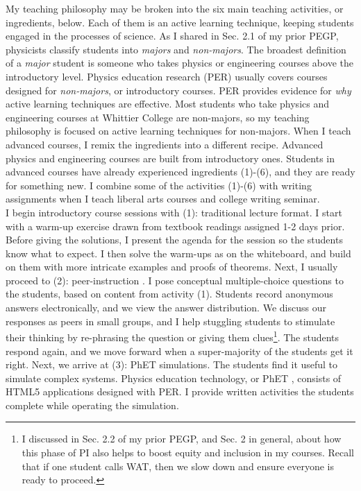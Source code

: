 \documentclass[../../../main.tex]{subfiles}
\begin{document}
My teaching philosophy may be broken into the six main teaching activities, or ingredients, below.  Each of them is an active learning technique, keeping students engaged in the processes of science.  As I shared in Sec. 2.1 of my prior PEGP, physicists classify students into \textit{majors} and \textit{non-majors}.  The broadest definition of a \textit{major} student is someone who takes physics or engineering courses above the introductory level.  Physics education research (PER) usually covers courses designed for \textit{non-majors}, or introductory courses.  PER provides evidence for \textit{why} active learning techniques are effective.  Most students who take physics and engineering courses at Whittier College are non-majors, so my teaching philosophy is focused on active learning techniques for non-majors.  When I teach advanced courses, I remix the ingredients into a different recipe.  Advanced physics and engineering courses are built from introductory ones.  Students in advanced courses have already experienced ingredients (1)-(6), and they are ready for something new.  I combine some of the activities (1)-(6) with writing assignments when I teach liberal arts courses and college writing seminar.
\\
\vspace{0.25cm}
I begin introductory course sessions with (1): traditional lecture format.  I start with a warm-up exercise drawn from textbook readings assigned 1-2 days prior.  Before giving the solutions, I present the agenda for the session so the students know what to expect.  I then solve the warm-ups as on the whiteboard, and build on them with more intricate examples and proofs of theorems.  Next, I usually proceed to (2): peer-instruction \cite{mazur2013peer}.  I pose conceptual multiple-choice questions to the students, based on content from activity (1).  Students record anonymous answers electronically, and we view the answer distribution.  We discuss our responses as peers in small groups, and I help stuggling students to stimulate their thinking by re-phrasing the question or giving them clues\footnote{I discussed in Sec. 2.2 of my prior PEGP, and Sec. 2 in general, about how this phase of PI also helps to boost equity and inclusion in my courses.  Recall that if one student calls WAT, then we slow down and ensure everyone is ready to proceed.}.  The students respond again, and we move forward when a super-majority of the students get it right.  Next, we arrive at (3): PhET simulations.  The students find it useful to simulate complex systems.  Physics education technology, or PhET \cite{phet}, consists of HTML5 applications designed with PER.  I provide written activities the students complete while operating the simulation.
\end{document}
